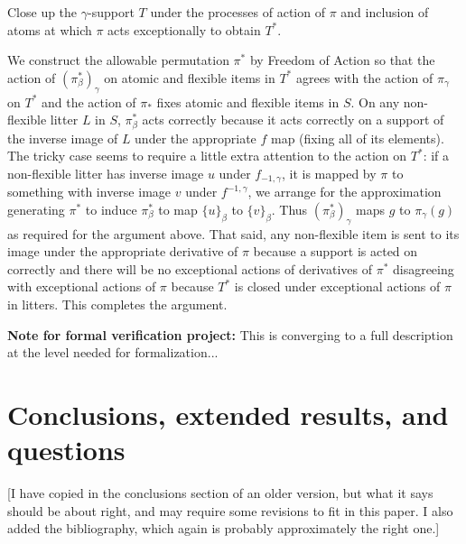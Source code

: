 \documentclass[112pt]{article}
\begin{document}
Close up the $\gamma$-support $T$ under the processes of action of $\pi$ and inclusion of atoms at which $\pi$ acts exceptionally to obtain $T^*$.

We construct the allowable permutation $\pi^*$ by Freedom of Action so that the action of $(\pi^*_\beta)_\gamma$ on atomic and flexible items in $T^*$ agrees with the action of $\pi_\gamma$ on $T^*$
and the action of $\pi_*$ fixes atomic and flexible items in $S$.  On any non-flexible litter $L$ in $S$, $\pi^*_\beta$ acts correctly because it acts correctly on a support of the inverse image of $L$ under the appropriate $f$ map (fixing all of its elements).
The tricky case seems to require a little extra attention to the action on $T^*$:  if a non-flexible litter has inverse image $u$ under $f_{-1,\gamma}$, it is mapped by $\pi$ to something with inverse image $v$ under $f^{-1,\gamma}$, we arrange for the
approximation generating $\pi^*$ to induce
$\pi^*_\beta$ to map $\{u\}_\beta$ to $\{v\}_\beta$.  Thus  $(\pi^*_\beta)_\gamma$ maps $g$ to $\pi_\gamma(g)$ as required for the argument above.  That said, any non-flexible item is sent to its image under the appropriate derivative of $\pi$ because
a support is acted on correctly and there will be no exceptional actions of derivatives of $\pi^*$ disagreeing with exceptional actions of $\pi$ because $T^*$ is closed under exceptional actions of $\pi$ in litters.  This completes the argument.

\begin{comment}
NOTE:  Difficult interactions with $S$ are avoided because an incompatibility of $\pi$ with fixing $S$ would involve moving most elements of a litter in the range of $f_{-1,\beta}$, and while $\pi$ may do this, nothing in the definition
of $\pi^*$ can force this to happen;  there is no conflict between the conditions imposed by $S$ and the conditions imposed by $T^*$.
\end{comment}














{\bf Note for formal verification project:}  This is converging to a full description at the level needed for formalization...

\newpage

\section{Conclusions, extended results, and questions}
[I have copied in the conclusions section of an older version, but what it says should be about right, 
and may require some revisions to fit in this paper.  I also added the bibliography, which again is probably approximately the right one.]
\end{document}
